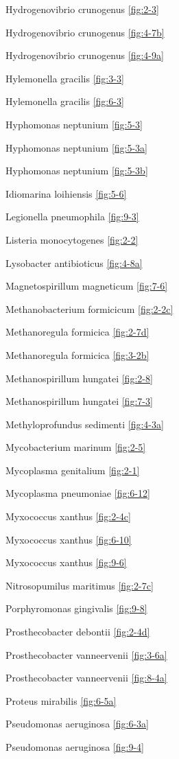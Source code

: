 \documentclass[]{tufte-book}
\begin{document}
Hydrogenovibrio crunogenus \ref{fig:2-3}

Hydrogenovibrio crunogenus \ref{fig:4-7b}

Hydrogenovibrio crunogenus \ref{fig:4-9a}

Hylemonella gracilis \ref{fig:3-3}

Hylemonella gracilis \ref{fig:6-3}

Hyphomonas neptunium \ref{fig:5-3}

Hyphomonas neptunium \ref{fig:5-3a}

Hyphomonas neptunium \ref{fig:5-3b}

Idiomarina loihiensis \ref{fig:5-6}

Legionella pneumophila \ref{fig:9-3}

Listeria monocytogenes \ref{fig:2-2}

Lysobacter antibioticus \ref{fig:4-8a}

Magnetospirillum magneticum \ref{fig:7-6}

Methanobacterium formicicum \ref{fig:2-2c}

Methanoregula formicica \ref{fig:2-7d}

Methanoregula formicica \ref{fig:3-2b}

Methanospirillum hungatei \ref{fig:2-8}

Methanospirillum hungatei \ref{fig:7-3}

Methyloprofundus sedimenti \ref{fig:4-3a}

Mycobacterium marinum \ref{fig:2-5}

Mycoplasma genitalium \ref{fig:2-1}

Mycoplasma pneumoniae \ref{fig:6-12}

Myxococcus xanthus \ref{fig:2-4c}

Myxococcus xanthus \ref{fig:6-10}

Myxococcus xanthus \ref{fig:9-6}

Nitrosopumilus maritimus \ref{fig:2-7c}

Porphyromonas gingivalis \ref{fig:9-8}

Prosthecobacter debontii \ref{fig:2-4d}

Prosthecobacter vanneervenii \ref{fig:3-6a}

Prosthecobacter vanneervenii \ref{fig:8-4a}

Proteus mirabilis \ref{fig:6-5a}

Pseudomonas aeruginosa \ref{fig:6-3a}

Pseudomonas aeruginosa \ref{fig:9-4}
\end{document}
